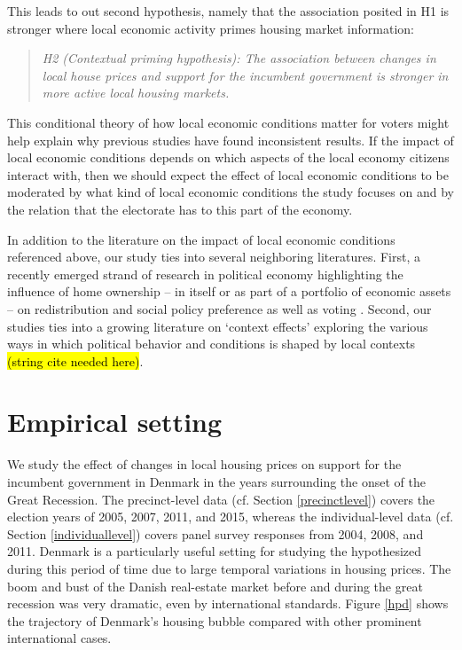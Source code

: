 \documentclass[12pt,a4paper]{article}
\begin{document}
	This leads to out second hypothesis, namely that the association posited in H1 is stronger where local economic activity primes housing market information:
	
	\newcommand{\htwo}{the contextual priming hypothesis}
	
	\begin{quote}
	\textit{H2 (Contextual priming hypothesis): The association between changes in local house prices and support for the incumbent government is stronger in more active local housing markets.}
	\end{quote}
	
	This conditional theory of how local economic conditions matter for voters might help explain why previous studies have found inconsistent results. If the impact of local economic conditions depends on which aspects of the local economy citizens interact with, then we should expect the effect of local economic conditions to be moderated by what kind of local economic conditions the study focuses on and by the relation that the electorate has to this part of the economy.
	
	In addition to the literature on the impact of local economic conditions referenced above, our study ties into several neighboring literatures. First, a recently emerged strand of research in political economy highlighting the influence of home ownership -- in itself or as part of a portfolio of economic assets -- on redistribution and social policy preference as well as voting \citep{ansell2014political,nadeau2010patrimonial,stubager2013reaching}. Second, our studies ties into a growing literature on `context effects' exploring the various ways in which political behavior and conditions is shaped by local contexts \hl{(string cite needed here)}. 
	
	\section{Empirical setting}
	
	We study the effect of changes in local housing prices on support for the incumbent government in Denmark in the years surrounding the onset of the Great Recession. The precinct-level data (cf. Section \ref{precinctlevel}) covers the election years of 2005, 2007, 2011, and 2015, whereas the individual-level data (cf. Section \ref{individuallevel}) covers panel survey responses from 2004, 2008, and 2011. Denmark is a particularly useful setting for studying the hypothesized during this period of time due to large temporal variations in housing prices. The boom and bust of the Danish real-estate market before and during the great recession was very dramatic, even by international standards. Figure \ref{hpd} shows the trajectory of Denmark's housing bubble compared with other prominent international cases.
	
\end{document}
